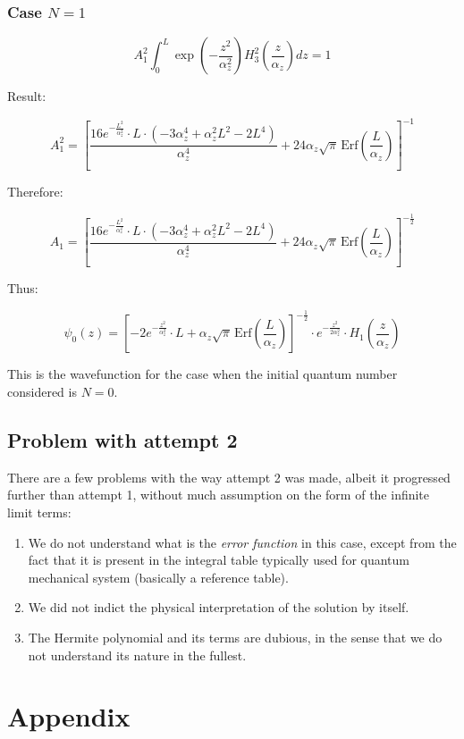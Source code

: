 \subsubsection{Case $N = 1$}
\[
A_1^2 \int_0^L \exp\left(-\frac{z^2}{\alpha_z^2}\right) H_3^2\left( \frac{z}{\alpha_z} \right) dz = 1
\]

Result:

\[
A_1^2 = \left[ \frac{16 e^{-\frac{L^2}{\alpha_z^2}} \cdot L \cdot ( -3 \alpha_z^4 + \alpha_z^2 L^2 - 2 L^4 )}{\alpha_z^4}
+ 24 \alpha_z \sqrt{\pi} \, \text{Erf}\left( \frac{L}{\alpha_z} \right) \right]^{-1}
\]

Therefore:

\[
A_1 = \left[ \frac{16 e^{-\frac{L^2}{\alpha_z^2}} \cdot L \cdot ( -3 \alpha_z^4 + \alpha_z^2 L^2 - 2 L^4 )}{\alpha_z^4}
+ 24 \alpha_z \sqrt{\pi} \, \text{Erf}\left( \frac{L}{\alpha_z} \right) \right]^{-\frac{1}{2}}
\]

Thus:

\[
\psi_0(z) = \left[ -2 e^{-\frac{z^2}{\alpha_z^2}} \cdot L + \alpha_z \sqrt{\pi} \, \mathrm{Erf}\left( \frac{L}{\alpha_z} \right) \right]^{-\frac{1}{2}} \cdot e^{-\frac{z^2}{2\alpha_z^2}} \cdot H_1\left( \frac{z}{\alpha_z} \right)
\]

This is the wavefunction for the case when the initial quantum number considered is $N = 0$.
\subsection{Problem with attempt 2}
There are a few problems with the way attempt 2 was made, albeit it progressed further than attempt 1, without much assumption on the form of the infinite limit terms: 
\begin{enumerate}
  \item We do not understand what is the \textit{error function} in this case, except from the fact that it is present in the integral table typically used for quantum mechanical system (basically a reference table). 
  \item We did not indict the physical interpretation of the solution by itself. 
  \item The Hermite polynomial and its terms are dubious, in the sense that we do not understand its nature in the fullest. 
\end{enumerate}
\section*{Appendix}

